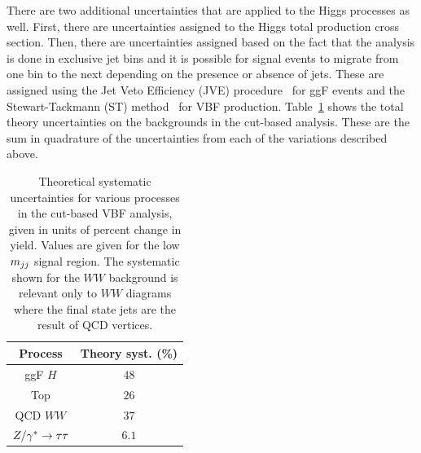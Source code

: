 
There are two additional uncertainties that are applied to the Higgs processes as well. First, there are uncertainties assigned to the Higgs total production cross section. Then, there are uncertainties assigned based on the fact that the analysis is done in exclusive jet bins and it is possible for signal events to migrate from one bin to the next depending on the presence or absence of jets. These are assigned using the Jet Veto Efficiency (JVE) procedure~\cite{LHCXSWG,JVE} for ggF events and the Stewart-Tackmann (ST) method~\cite{ST} for VBF production. Table~\ref{tab:vbf_cb_theosys} shows the total theory uncertainties on the backgrounds in the cut-based analysis. These are the sum in quadrature of the uncertainties from each of the variations described above. 


\begin{table}[h!]
\centering
\captionsetup{justification=centering}
\begin{tabular}{|c|c|}
\hline
Process & Theory syst. (\%)  \\ \hline
ggF $H$ & $48$ \\ \hline
Top & $26$ \\ \hline
QCD $WW$ & $37$ \\ \hline
$Z/\gamma^{\ast} \to \tau\tau$ & $6.1$ \\ \hline
\end{tabular}
\caption{Theoretical systematic uncertainties for various processes in the cut-based VBF analysis, given in units of percent change in yield. Values are given for the low $m_{jj}$ signal region. The systematic shown for the $WW$ background is relevant only to $WW$ diagrams where the final state jets are the result of QCD vertices.}
\label{tab:vbf_cb_theosys}
\end{table}

